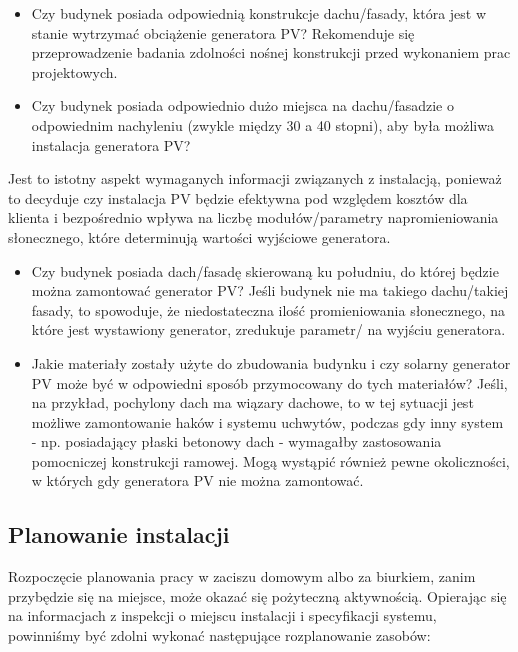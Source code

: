 \documentclass[12pt,a4paper]{article}
\begin{document}
\begin{itemize}
\item Czy budynek posiada odpowiednią konstrukcje dachu/fasady, która 
jest w stanie wytrzymać obciążenie generatora PV? Rekomenduje się 
przeprowadzenie badania zdolności nośnej konstrukcji przed wykonaniem 
prac projektowych. 
\item Czy budynek posiada odpowiednio dużo miejsca na dachu/fasadzie o 
odpowiednim nachyleniu (zwykle między 30 a 40 stopni), aby była możliwa instalacja generatora PV? 
\end{itemize}

Jest to istotny aspekt wymaganych informacji związanych z 
instalacją, ponieważ to decyduje czy instalacja PV będzie efektywna pod 
względem kosztów dla klienta i bezpośrednio wpływa na liczbę 
modułów/parametry napromieniowania słonecznego, które determinują 
wartości wyjściowe generatora. 

\begin{itemize}
\item Czy budynek posiada dach/fasadę skierowaną ku południu, do której 
będzie można zamontować generator PV? Jeśli budynek nie ma takiego 
dachu/takiej fasady, to spowoduje, że niedostateczna ilość 
promieniowania słonecznego, na które jest wystawiony generator, 
zredukuje parametr/ na wyjściu generatora. 
\item Jakie materiały zostały użyte do zbudowania budynku i czy solarny 
generator PV może być w odpowiedni sposób przymocowany do tych 
materiałów? Jeśli, na przykład, pochylony dach ma wiązary dachowe, to w 
tej sytuacji jest możliwe zamontowanie haków i systemu uchwytów, podczas 
gdy inny system - np. posiadający płaski betonowy dach - wymagałby 
zastosowania pomocniczej konstrukcji ramowej. Mogą wystąpić również 
pewne okoliczności, w których gdy generatora PV nie można zamontować.
\end{itemize}
 

\subsection{Planowanie instalacji }


Rozpoczęcie planowania pracy w zaciszu domowym albo za biurkiem, zanim 
przybędzie się na miejsce, może okazać się pożyteczną aktywnością. 
Opierając się na informacjach z inspekcji o miejscu instalacji i 
specyfikacji systemu, powinniśmy być zdolni wykonać następujące 
rozplanowanie zasobów: 
\end{document}

